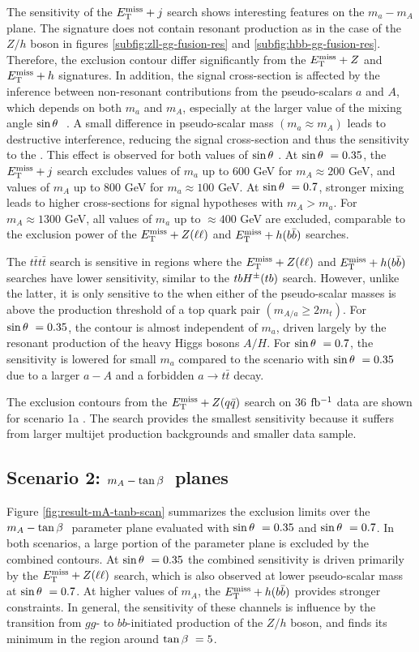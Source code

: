The sensitivity of the $E_{\mathrm{T}}^{\mathrm{miss}}+j$ search shows interesting features on the $m_a-m_A$ plane. The signature does not contain resonant production as in the case of the $Z/h$ boson in figures \ref{subfig:zll-gg-fusion-res} and \ref{subfig:hbb-gg-fusion-res}. Therefore, the exclusion contour differ significantly from the $E_{\mathrm{T}}^{\mathrm{miss}}+Z$ and $E_{\mathrm{T}}^{\mathrm{miss}}+h$ signatures. In addition, the signal cross-section is affected by the inference between non-resonant contributions from the pseudo-scalars $a$ and $A$, which depends on both $m_a$ and $m_A$, especially at the larger value of the mixing angle $\sin\theta~$ \cite{Bauer:2017ota}. A small difference in pseudo-scalar mass $(m_a\approx m_A)$ leads to destructive interference, reducing the signal cross-section and thus the sensitivity to the \hdma. This effect is observed for both values of $\sin\theta~$. At $\sin\theta~=0.35$, the $E_{\mathrm{T}}^{\mathrm{miss}}+j$ search excludes values of $m_a$ up to 600 GeV for $m_A\approx 200$ GeV, and values of $m_A$ up to 800 GeV for $m_a\approx 100 $ GeV. At $\sin\theta~=0.7$, stronger mixing leads to higher cross-sections for signal hypotheses with $m_A>m_a$. For $m_A\approx 1300$ GeV, all values of $m_a$ up to $\approx 400$ GeV are excluded, comparable to the exclusion power of the $E_{\mathrm{T}}^{\mathrm{miss}}+Z(\ell\ell)$ and $E_{\mathrm{T}}^{\mathrm{miss}}+h(b\bar{b})$ searches. 

The $t\bar{t}t\bar{t}$ search is sensitive in regions where the $E_{\mathrm{T}}^{\mathrm{miss}}+Z(\ell\ell)$ and $E_{\mathrm{T}}^{\mathrm{miss}}+h(b\bar{b})$ searches have lower sensitivity, similar to the $tbH^{\pm}(tb)$ search. However, unlike the latter, it is only sensitive to the \thdma when either of the pseudo-scalar masses is above the production threshold of a top quark pair $(m_{A/a}\ge 2m_t)$. For $\sin\theta~ = 0.35$, the contour is almost independent of $m_a$, driven largely by the resonant production of the heavy Higgs bosons $A/H$. For $\sin\theta~ = 0.7$, the sensitivity is lowered for small $m_a$ compared to the scenario with $\sin\theta~=0.35$ due to a larger $a-A$ and a forbidden $a\rightarrow t\bar{t}$ decay.

The exclusion contours from the $E_{\mathrm{T}}^{\mathrm{miss}} + Z(q\bar{q})$ search on 36 $\mbox{fb\(^{-1}\)}$ data are shown for scenario 1a \cite{EXOT-2017-32}. The search provides the smallest sensitivity because it suffers from larger multijet production backgrounds and smaller data sample.

\subsection{Scenario 2: \texorpdfstring{$m_A-\tan\beta~$}{TEXT} planes}

Figure \ref{fig:result-mA-tanb-scan} summarizes the exclusion limits over the $m_A-\tan\beta~$ parameter plane evaluated with $\sin\theta~ = 0.35$ and $\sin\theta~ = 0.7$. In both scenarios, a large portion of the parameter plane is excluded by the combined contours. At $\sin\theta~=0.35$ the combined sensitivity is driven primarily by the $E_{\mathrm{T}}^{\mathrm{miss}}+Z(\ell\ell)$ search, which is also observed at lower pseudo-scalar mass at $\sin\theta~=0.7$. At higher values of $m_A$, the $E_{\mathrm{T}}^{\mathrm{miss}}+h(b\bar{b})$ provides stronger constraints. In general, the sensitivity of these channels is influence by the transition from $gg$- to $bb$-initiated production of the $Z/h$ boson, and finds its minimum in the region around $\tan\beta~=5$. 


